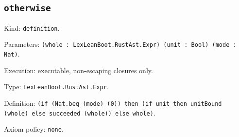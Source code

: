 \documentclass[11pt]{article}
\begin{document}
\subsection*{\texttt{otherwise}}
\noindent Kind: \texttt{definition}.\par
\noindent Parameters: \texttt{(whole : LexLeanBoot.RustAst.Expr) (unit : Bool) (mode : Nat)}.\par
\noindent Execution: executable, non-escaping closures only.\par
\noindent Type: \texttt{LexLeanBoot.RustAst.Expr}.\par
\noindent Definition: \texttt{(if (Nat.beq (mode) (0)) then (if unit then unitBound (whole) else succeeded (whole)) else whole)}.\par
\noindent Axiom policy: \texttt{none}.\par
\end{document}
